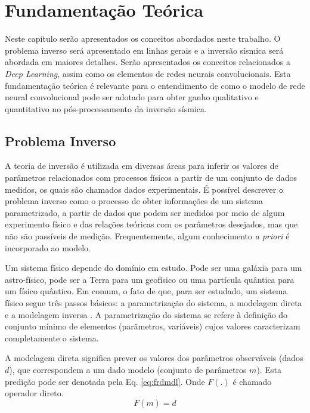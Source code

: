 \chapter{Fundamentação Teórica}
\label{cap:2fundamentacao}
Neste capítulo serão apresentados os conceitos
abordados neste trabalho. O problema inverso será apresentado
em linhas gerais e a inversão sísmica será abordada em maiores detalhes.
Serão apresentados os conceitos relacionados a \textit{Deep Learning}, assim como os
elementos de redes neurais convolucionais. Esta fundamentação
teórica é relevante para o entendimento de como o modelo de rede neural convolucional
pode ser adotado para obter ganho qualitativo e quantitativo no pós-processamento
da inversão sísmica.

\section{Problema Inverso}

A teoria de inversão é utilizada em diversas áreas para inferir os valores de
parâmetros relacionados com processos físicos a partir de um conjunto de dados medidos,
os quais são chamados dados experimentais. É possível descrever o problema inverso
como o processo de obter informações de um sistema parametrizado, a partir de
dados que podem ser medidos por meio de algum experimento físico e das relações teóricas com os parâmetros
desejados, mas que não são passíveis de medição. Frequentemente, algum conhecimento \textit{a priori}
é incorporado ao modelo.

Um sistema físico depende do domínio em estudo. Pode ser uma galáxia para um
astro-físico, pode ser a Terra para um geofísico ou uma partícula quântica
para um físico quântico. Em comum, o fato de que, para ser estudado, um sistema
físico segue três passos básicos: a parametrização do sistema, a modelagem direta e a modelagem inversa \cite{tarantola}.
A parametrização do sistema se refere à definição do conjunto mínimo de elementos (parãmetros, variáveis)
cujos valores caracterizam completamente o sistema.

A modelagem direta significa prever os valores dos parâmetros observáveis (dados $d$),
que correspondem a um dado modelo (conjunto de parâmetros $m$). Esta predição pode ser denotada
pela Eq. \ref{eq:frdmdl}. Onde $F(.)$ é chamado operador direto.
\begin{equation}
\label{eq:frdmdl}
F(m) = d 
\end{equation}

